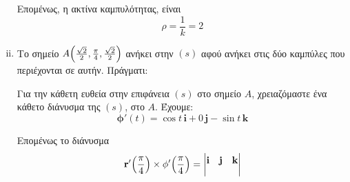 \documentclass[a4paper,table]{report}
\begin{document}
\begin{solution}
\begin{enumerate}[i)]
\[        \] 
        Επομένως, η ακτίνα καμπυλότητας, είναι
        \[
          \rho = \frac{1}{k} = 2 
        \] 
      \item Το σημείο $ A\Bigl(\frac{\sqrt{2}}{2} , \frac{\pi}{4} ,
        \frac{\sqrt{2}}{2}\Bigr) $ ανήκει στην $ (s) $ αφού ανήκει στις δύο καμπύλες 
        που περιέχονται σε αυτήν. Πράγματι:
        Για την κάθετη ευθεία στην επιφάνεια $ (s) $ στο σημείο $ A $, χρειαζόμαστε 
        ένα κάθετο διάνυσμα της $ (s) $, στο $A$. Έχουμε:
        \[
          \mathbf{\phi'}(t) =  \cos{t}\,\mathbf{i} + 0\,\mathbf{j} - \sin{t} \,\mathbf{k}
        \] 
        Επομένως το διάνυσμα 
        \[
          \mathbf{r'}\Bigl(\frac{\pi}{4}\Bigr) \times \mathbf{\phi'}\Bigl(\frac{\pi}{4}\Bigr) = 
          \begin{vmatrix*}[c]
            \mathbf{i} & \mathbf{j} & \mathbf{k} \\[8pt]

\end{vmatrix*}\]
\end{enumerate}
\end{solution}
\end{document}
